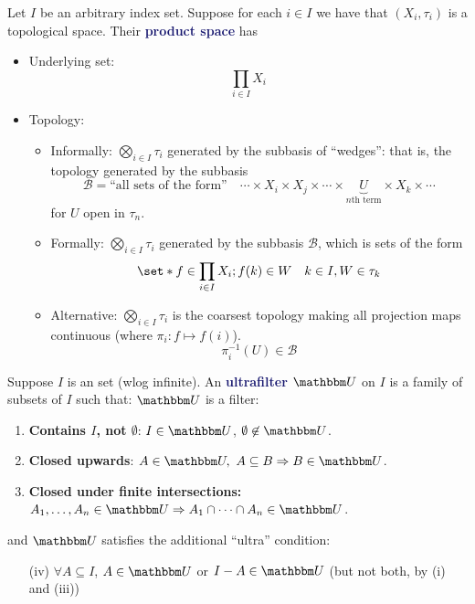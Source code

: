 \documentclass[11pt]{article}
\numberwithin{equation}{section}
\newcommand{\navy}[1]{\textcolor{MidnightBlue}{\bf #1}}
\theoremstyle{definition}
\theoremstyle{definition}
\def\Set{\set*}%
\def\sse{\subseteq}
\def\imp{\Rightarrow}
\newcommand{\1}{\mathbbm 1}
\def\t{\tau}
\newcommand{\UU}{\mathbbm U}
\newcommand{\bB}{\mathcal B}
\begin{document}
\begin{definition}
Let $I$ be an arbitrary index set. Suppose for each $i \in I$ we have that $(X_i, \t_i)$ is a topological space. Their \navy{product space} has
\begin{itemize}
\item Underlying set:
\begin{equation}
\prod_{i \in I} X_i
\end{equation}
\item Topology:
\begin{itemize}
\item Informally: $\bigotimes_{i \in I} \t_i$ generated by the subbasis of ``wedges'': that is, the topology generated by the subbasis
\begin{equation}
\bB = \text{``all sets of the form''} \quad \cdots \times X_i \times X_j \times \cdots \times \underbrace{U}_{n \text{th term}} \times X_k \times \cdots
\end{equation}
for $U$ open in $\t_n$.
\item Formally: $\bigotimes_{i \in I} \t_i$ generated by the subbasis $\bB$, which is sets of the form
\begin{equation}
\Set{f \in \prod_{i \in I} X_i; f(k) \in W} \quad k \in I, W \in \t_k
\end{equation}
\item Alternative: $\bigotimes_{i \in I} \t_i$ is the coarsest topology making all projection maps continuous (where $\pi_i: f \mapsto f(i)$).
\begin{equation}
\pi_i^{-1}(U) \in \bB
\end{equation}
\end{itemize}
\end{itemize}
\end{definition}

\begin{definition}[Ultrafilter]
Suppose $I$ is an set (wlog infinite). An \navy{ultrafilter $\UU$} on $I$ is a family of subsets of $I$ such that:
$\UU$ is a filter:
\begin{enumerate}
\item \textbf{Contains $I$, not $\emptyset$}: $I \in \UU$, $\emptyset \not\in \UU$.
\item \textbf{Closed upwards}: $A \in \UU, \ A \sse B \imp B \in \UU$.
\item \textbf{Closed under finite intersections:} $A_1, \ldots, A_n \in \UU \imp A_1 \cap \cdots \cap A_n \in \UU$.
\end{enumerate}
and $\UU$ satisfies the additional ``ultra'' condition:
\begin{enumerate}
\item[(iv)] $\forall A \sse I$, $A \in \UU$ or $I - A \in \UU$ (but not both, by (i) and (iii))
\end{enumerate}
\end{definition}
\end{document}
